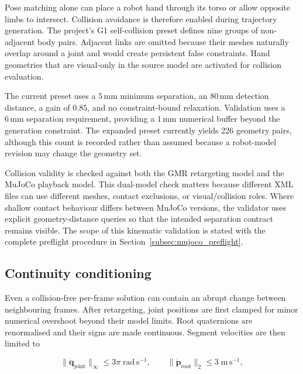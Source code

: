 Pose matching alone can place a robot hand through its torso or allow opposite
limbs to intersect. Collision avoidance is therefore enabled during trajectory
generation. The project's G1 self-collision preset defines nine groups of
non-adjacent body pairs. Adjacent links are omitted because their meshes
naturally overlap around a joint and would create persistent false constraints.
Hand geometries that are visual-only in the source model are activated for
collision evaluation.

The current preset uses a $5\,\mathrm{mm}$ minimum separation, an
$80\,\mathrm{mm}$ detection distance, a gain of $0.85$, and no constraint-bound
relaxation. Validation uses a $6\,\mathrm{mm}$ separation requirement, providing
a $1\,\mathrm{mm}$ numerical buffer beyond the generation constraint. The
expanded preset currently yields 226 geometry pairs, although this count is
recorded rather than assumed because a robot-model revision may change the
geometry set.

Collision validity is checked against both the GMR retargeting model and the
MuJoCo playback model. This dual-model check matters because different XML
files can use different meshes, contact exclusions, or visual/collision roles.
Where shallow contact behaviour differs between MuJoCo versions, the validator
uses explicit geometry-distance queries so that the intended separation
contract remains visible. The scope of this kinematic validation is stated with
the complete preflight procedure in Section~\ref{subsec:mujoco_preflight}.

\subsection{Continuity conditioning}
\label{subsec:retarget_continuity}

Even a collision-free per-frame solution can contain an abrupt change between
neighbouring frames. After retargeting, joint positions are first clamped for
minor numerical overshoot beyond their model limits. Root quaternions are
renormalised and their signs are made continuous. Segment velocities are then
limited to

\begin{equation}
    \|\dot{\mathbf{q}}_{\mathrm{joint}}\|_{\infty}
        \leq 3\pi\;\mathrm{rad\,s^{-1}},\qquad
    \|\dot{\mathbf{p}}_{\mathrm{root}}\|_2
        \leq 3\;\mathrm{m\,s^{-1}},
    \label{eq:retarget_linear_limits}
\end{equation}

